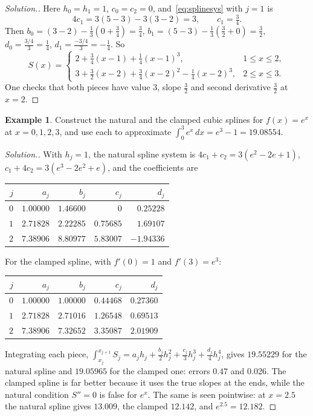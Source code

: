 \documentclass[11pt,a4paper]{article}
\numberwithin{equation}{section}
\theoremstyle{definition}
\newtheorem{exa}[thm]{Example}
\newenvironment{solution}
  {\renewcommand{\qedsymbol}{}\begin{proof}[\textit{Solution}.]}
  {\end{proof}}
\begin{document}
\begin{solution}
Here $h_0 = h_1 = 1$, $c_0 = c_2 = 0$, and~\eqref{eq:splinesys} with $j = 1$ is
$$4c_1 = 3(5-3)-3(3-2) = 3,\qquad c_1 = \tfrac34 .$$
Then $b_0 = (3-2)-\frac13\left(0+\frac34\right) = \frac34$, $b_1 = (5-3)-\frac13\left(\frac32+0\right) = \frac32$, $d_0 = \frac{3/4}{3} = \frac14$, $d_1 = \frac{-3/4}{3} = -\frac14$. So
$$S(x) = \begin{cases}2+\frac34(x-1)+\frac14(x-1)^3, & 1\leq x\leq2,\\[2pt] 3+\frac32(x-2)+\frac34(x-2)^2-\frac14(x-2)^3, & 2\leq x\leq3 .\end{cases}$$
One checks that both pieces have value $3$, slope $\frac32$ and second derivative $\frac32$ at $x = 2$.
\end{solution}

\begin{exa}
\label{exa:splineexp}
Construct the natural and the clamped cubic splines for $f(x) = e^x$ at $x = 0,1,2,3$, and use each to approximate $\int_0^3e^x\,dx =
e^3-1 = 19.08554$.
\end{exa}

\begin{solution}
With $h_j = 1$, the natural spline system is $4c_1+c_2 = 3(e^2-2e+1)$, $c_1+4c_2 = 3(e^3-2e^2+e)$, and the coefficients are
\begin{center}
\begin{tabular}{rrrrr}
\hline
$j$ & $a_j$ & $b_j$ & $c_j$ & $d_j$\\
\hline
$0$ & $1.00000$ & $1.46600$ & $0$ & $0.25228$\\
$1$ & $2.71828$ & $2.22285$ & $0.75685$ & $1.69107$\\
$2$ & $7.38906$ & $8.80977$ & $5.83007$ & $-1.94336$\\
\hline
\end{tabular}
\end{center}
For the clamped spline, with $f'(0) = 1$ and $f'(3) = e^3$:
\begin{center}
\begin{tabular}{rrrrr}
\hline
$j$ & $a_j$ & $b_j$ & $c_j$ & $d_j$\\
\hline
$0$ & $1.00000$ & $1.00000$ & $0.44468$ & $0.27360$\\
$1$ & $2.71828$ & $2.71016$ & $1.26548$ & $0.69513$\\
$2$ & $7.38906$ & $7.32652$ & $3.35087$ & $2.01909$\\
\hline
\end{tabular}
\end{center}
Integrating each piece, $\int_{x_j}^{x_{j+1}}S_j = a_jh_j+\frac{b_j}2h_j^2+\frac{c_j}3h_j^3+\frac{d_j}4h_j^4$, gives $19.55229$ for the natural spline and
$19.05965$ for the clamped one: errors $0.47$ and $0.026$. The clamped spline is far better because it uses the true slopes at the ends,
while the natural condition $S'' = 0$ is false for $e^x$. The same is seen pointwise: at $x = 2.5$ the natural spline gives $13.009$, the clamped
$12.142$, and $e^{2.5} = 12.182$.
\end{solution}
\end{document}
